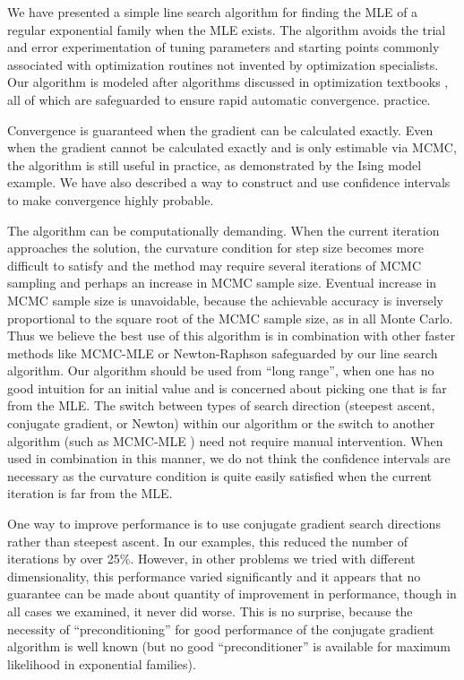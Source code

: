 We have presented a simple line search algorithm for finding the MLE of a regular 
exponential family when the MLE 
exists.  The algorithm avoids the trial and error experimentation of tuning parameters 
and starting points commonly associated with optimization routines
not invented by optimization specialists.  Our algorithm is modeled after algorithms 
discussed in optimization textbooks \citep{Fletcher,NW,Sun:2006},
all of which are safeguarded to ensure rapid automatic convergence.
practice.

Convergence is guaranteed when the gradient can be calculated exactly.  Even when the 
gradient cannot be calculated 
exactly and is only estimable via MCMC, the algorithm is still useful in practice, as 
demonstrated by the Ising model 
example.  We have also described a way to construct and use confidence intervals to 
make convergence highly probable.

The algorithm can be computationally demanding.  When the current iteration approaches 
the solution, the 
curvature condition for step size becomes more difficult to satisfy and the method may 
require several iterations of 
MCMC sampling and perhaps an increase in MCMC sample size.  Eventual increase in MCMC 
sample size is unavoidable,
because the achievable accuracy is inversely proportional to the square root of the 
MCMC sample size, as in all Monte Carlo.
Thus we believe the best use of this algorithm is in combination with other faster 
methods like MCMC-MLE \citep{Geyer:1992}
or Newton-Raphson safeguarded by our line search algorithm.  Our 
algorithm should be used from ``long range'', when one has no good intuition for an 
initial value and is concerned about 
picking one that is far from the MLE.  The switch between types of search direction 
(steepest ascent, conjugate gradient,
or Newton) within our algorithm or the switch to another algorithm (such as MCMC-MLE 
\citep{Geyer:1992})
need not require manual intervention.  When used in combination in this
manner, we do not think the confidence intervals are necessary as the curvature 
condition is quite easily satisfied 
when the current iteration is far from the MLE.

One way to improve performance is to use conjugate gradient search directions rather 
than steepest ascent.  In our 
examples, this reduced the number of iterations by over 25\%.  However, in other 
problems we tried with different 
dimensionality, this performance varied significantly and it appears that no guarantee 
can be made about quantity of 
improvement in performance, though in all cases we examined, it never did worse.  This 
is no surprise, because the
necessity of ``preconditioning'' for good performance of the conjugate gradient 
algorithm is well known (but no
good ``preconditioner'' is available for maximum likelihood in exponential families).

